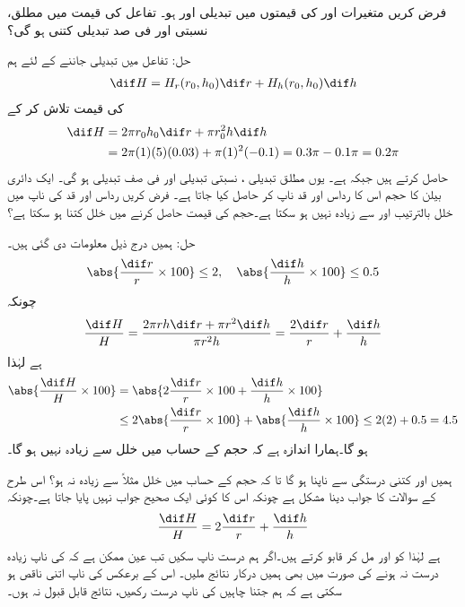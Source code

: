فرض کریں متغیرات  اور  کی   قیمتوں    میں تبدیلی   اور  ہو۔ تفاعل   کی قیمت میں مطلق، نسبتی اور فی صد تبدیلی کتنی ہو گی؟

حل:\quad
تفاعل  میں تبدیلی جاننے کے لئے ہم
\begin{align*}
\dif H=H_r(r_0,h_0)\dif r+H_h(r_0,h_0)\dif h
\end{align*}
کی قیمت تلاش کر کے
\begin{align*}
\dif H&=2\pi r_0h_0\dif r+\pi r_0^2h\dif h\\
&=2\pi(1)(5)(0.03)+\pi(1)^2(-0.1)=0.3\pi-0.1\pi=0.2\pi
\end{align*}
حاصل کرتے ہیں جبکہ    ہے۔  یوں مطلق تبدیلی ،  نسبتی تبدیلی  اور فی صف تبدیلی  ہو گی۔ 
ایک دائری بیلن  کا حجم   اس کا رداس اور قد ناپ کر حاصل کیا جاتا ہے۔ فرض کریں رداس اور قد  کی ناپ میں خلل  بالترتیب   اور   سے زیادہ نہیں ہو سکتا ہے۔حجم  کی قیمت حاصل کرنے میں خلل کتنا ہو سکتا ہے؟

حل:\quad
ہمیں درج ذیل معلومات دی گئی ہیں۔
\begin{align*}
\abs{\frac{\dif r}{r}\times 100}\le 2,\quad \abs{\frac{\dif h}{h}\times 100}\le 0.5
\end{align*}
چونکہ
\begin{align*}
\frac{\dif H}{H}=\frac{2\pi rh\dif r+\pi r^2\dif h}{\pi r^2h}=\frac{2\dif r}{r}+\frac{\dif h}{h}
\end{align*}
ہے لہٰذا 
\begin{align*}
\abs{\frac{\dif H}{H}\times 100}&=\abs{2\frac{\dif r}{r}\times 100+\frac{\dif h}{h}\times 100}\\
&\le 2\abs{\frac{\dif r}{r}\times 100}+\abs{\frac{\dif h}{h}\times 100}\le 2(2)+0.5=4.5
\end{align*}
ہو گا۔ہمارا اندازہ  ہے کہ حجم  کے حساب میں خلل   سے زیادہ نہیں ہو گا۔

ہمیں  اور  کتنی درستگی سے ناپنا ہو گا تا کہ حجم کے حساب میں خلل  مثلاً  سے زیادہ نہ ہو؟ اس طرح کے سوالات کا جواب دینا مشکل ہے چونکہ اس کا کوئی ایک صحیح جواب نہیں پایا جاتا ہے۔چونکہ
\begin{align*}
\frac{\dif H}{H}=2\frac{\dif r}{r}+\frac{\dif h}{h}
\end{align*}
ہے لہٰذا  کو  اور   مل کر قابو کرتے ہیں۔اگر ہم  درست  ناپ سکیں تب  عین  ممکن ہے کہ  کی ناپ زیادہ درست نہ ہونے کی صورت میں بھی ہمیں درکار نتائج  ملیں۔ اس کے برعکس     کی ناپ اتنی ناقص ہو سکتی ہے کہ ہم جتنا چاہیں  کی ناپ درست رکھیں، نتائج قابل قبول نہ ہوں۔

